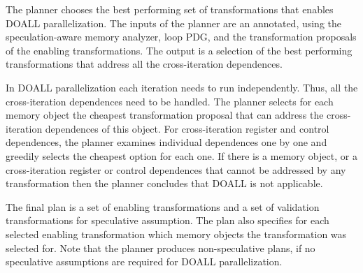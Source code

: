 The planner chooses the best performing set of transformations that
enables DOALL parallelization.
%
The inputs of the planner are an annotated, using the
speculation-aware memory analyzer, loop PDG, and the transformation
proposals of the enabling transformations.
%
The output is a selection of the best performing transformations that
address all the cross-iteration dependences. 


In DOALL parallelization each iteration needs to run independently.
Thus, all the cross-iteration dependences need to be handled.
%
The planner selects for each memory object the cheapest transformation
proposal that can address the cross-iteration dependences of this
object.
%
%
For cross-iteration register and control dependences, the planner
examines individual dependences one by one and greedily selects the
cheapest option for each one.  
%
If there is a memory object, or a cross-iteration register or control
dependences that cannot be addressed by any transformation then the
planner concludes that DOALL is not applicable.


The final plan is a set of enabling transformations and a set of
validation transformations for speculative assumption.  The plan also
specifies for each selected enabling transformation which memory
objects the transformation was selected for.
%
Note that the planner produces non-speculative plans, if no
speculative assumptions are required for DOALL parallelization.

